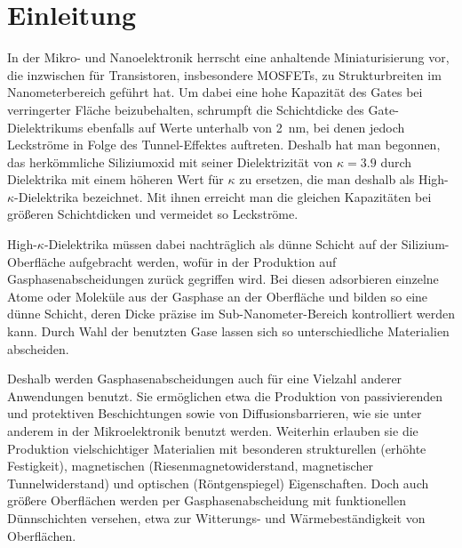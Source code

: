\cleardoublepage
\chapter{Einleitung}
\label{intro}


In der Mikro- und Nanoelektronik herrscht eine anhaltende Miniaturisierung vor, die inzwischen für Transistoren, insbesondere MOSFETs, zu Strukturbreiten im Nanometerbereich geführt hat.
Um dabei eine hohe Kapazität des Gates bei verringerter Fläche beizubehalten, schrumpft die Schichtdicke des Gate-Dielektrikums ebenfalls auf Werte unterhalb von \SI{2}{\nano\meter}, bei denen jedoch Leckströme in Folge des Tunnel-Effektes auftreten.
Deshalb hat man begonnen, das herkömmliche Siliziumoxid mit seiner Dielektrizität von $\kappa=\num{3.9}$ durch Dielektrika mit einem höheren Wert für $\kappa$ zu ersetzen, die man deshalb als High-$\kappa$-Dielektrika bezeichnet.
Mit ihnen erreicht man die gleichen Kapazitäten bei größeren Schichtdicken und vermeidet so Leckströme.%


High-$\kappa$-Dielektrika müssen dabei nachträglich als dünne Schicht auf der Silizium-Oberfläche aufgebracht werden, wofür in der Produktion auf Gasphasenabscheidungen zurück gegriffen wird.
Bei diesen adsorbieren einzelne Atome oder Moleküle aus der Gasphase an der Oberfläche und bilden so eine dünne Schicht, deren Dicke präzise im Sub-Nanometer-Bereich kontrolliert werden kann.
Durch Wahl der benutzten Gase lassen sich so unterschiedliche Materialien abscheiden.

Deshalb werden Gasphasenabscheidungen auch für eine Vielzahl anderer Anwendungen benutzt.
Sie ermöglichen etwa die Produktion von passivierenden und protektiven Beschichtungen sowie von Diffusionsbarrieren, wie sie unter anderem in der Mikroelektronik benutzt werden.
Weiterhin erlauben sie die Produktion vielschichtiger Materialien mit besonderen strukturellen (erhöhte Festigkeit), magnetischen (Riesenmagnetowiderstand, magnetischer Tunnelwiderstand) und optischen (Röntgenspiegel) Eigenschaften.
Doch auch größere Oberflächen werden per Gasphasenabscheidung mit funktionellen Dünnschichten versehen, etwa zur Witterungs- und Wärmebeständigkeit von Oberflächen.

